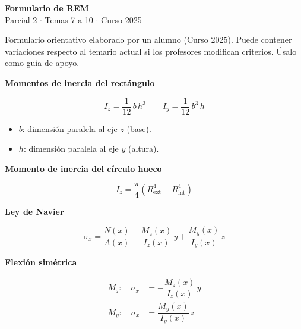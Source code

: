\documentclass[10pt,a4paper]{article}
\newcommand{\tema}[2]{\vspace{1.1em}{\large\bfseries\color{ink}Tema #1\quad #2}\par\vspace{1pt}{\color{signal}\rule{\linewidth}{1.4pt}}\par\vspace{-2pt}}
\begin{document}
\begin{tcolorbox}[colback=ink,colframe=ink,coltext=white,arc=1.5mm,boxrule=0pt,left=10pt,right=10pt,top=8pt,bottom=8pt]
{\Large\bfseries Formulario de REM}\\[3pt]
{\large Parcial 2 $\cdot$ Temas 7 a 10 $\cdot$ Curso 2025}
\end{tcolorbox}

\begin{tcolorbox}[enhanced,colback=signal!14,colframe=signal!14,boxrule=0pt,arc=0mm,
  borderline west={3pt}{0pt}{signal},left=9pt,right=8pt,top=5pt,bottom=5pt,before skip=8pt]
\small Formulario orientativo elaborado por un alumno (Curso 2025). Puede contener variaciones respecto al temario actual si los profesores modifican criterios. Úsalo como guía de apoyo.
\end{tcolorbox}

\tema{7}{Flexión}

\begin{tcolorbox}[itembox]
\textbf{Momentos de inercia del rectángulo}\par
\[
I_z=\dfrac{1}{12}\,b\,h^{3}\qquad I_y=\dfrac{1}{12}\,b^{3}\,h
\]
{\small\begin{itemize}[leftmargin=*,nosep,label={--}]
\item $b$: dimensión paralela al eje $z$ (base).
\item $h$: dimensión paralela al eje $y$ (altura).
\end{itemize}}
\end{tcolorbox}

\begin{tcolorbox}[itembox]
\textbf{Momento de inercia del círculo hueco}\par
\[
I_z=\dfrac{\pi}{4}\left(R_{\text{ext}}^{4}-R_{\text{int}}^{4}\right)
\]
\smallskip{}\par
\end{tcolorbox}

\begin{tcolorbox}[itembox]
\textbf{Ley de Navier}\par
\[
\sigma_x=\dfrac{N(x)}{A(x)}-\dfrac{M_z(x)}{I_z(x)}\,y+\dfrac{M_y(x)}{I_y(x)}\,z
\]
\end{tcolorbox}

\begin{tcolorbox}[itembox]
\textbf{Flexión simétrica}\par
\[
\begin{aligned}M_z:\quad\sigma_x&=-\dfrac{M_z(x)}{I_z(x)}\,y\\ M_y:\quad\sigma_x&=\dfrac{M_y(x)}{I_y(x)}\,z\end{aligned}
\]
\end{tcolorbox}
\end{document}
